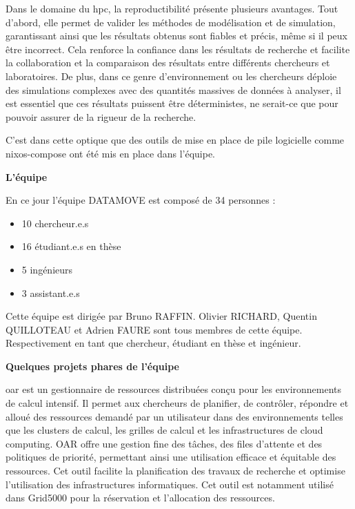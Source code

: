 \documentclass[a4paper,french,12pt, titlepage]{article}
\begin{document}
Dans le domaine du \Gls{hpc}, la reproductibilité présente plusieurs
avantages. Tout d'abord, elle permet de valider les méthodes de
modélisation et de simulation, garantissant ainsi que les résultats
obtenus sont fiables et précis, même si il peux être incorrect. Cela
renforce la confiance dans les résultats de recherche et facilite la
collaboration et la comparaison des résultats entre différents
chercheurs et laboratoires. De plus, dans ce genre d'environnement ou
les chercheurs déploie des simulations complexes avec des quantités
massives de données à analyser, il est essentiel que ces résultats
puissent être déterministes, ne serait-ce que pour pouvoir assurer de la
rigueur de la recherche.\newline

C'est dans cette optique que des outils de mise en place de pile
logicielle comme \Gls{nixos-compose} ont été mis en place dans
l'équipe.\newline

\textbf{L'équipe}\newline

En ce jour l'équipe DATAMOVE est composé de 34 personnes :

\begin{itemize}
\item
  10 chercheur.e.s
\item
  16 étudiant.e.s en thèse
\item
  5 ingénieurs
\item
  3 assistant.e.s\newline
\end{itemize}

Cette équipe est dirigée par Bruno RAFFIN. Olivier RICHARD, Quentin
QUILLOTEAU et Adrien FAURE sont tous membres de cette équipe.
Respectivement en tant que chercheur, étudiant en thèse et
ingénieur.\newline

\textbf{Quelques projets phares de l'équipe}\newline

\Gls{oar} est un gestionnaire de ressources distribuées conçu pour les
environnements de calcul intensif. Il permet aux chercheurs de
planifier, de contrôler, répondre et alloué des ressources demandé par
un utilisateur dans des environnements telles que les clusters de
calcul, les grilles de calcul et les infrastructures de cloud computing.
OAR offre une gestion fine des tâches, des files d'attente et des
politiques de priorité, permettant ainsi une utilisation efficace et
équitable des ressources. Cet outil facilite la planification des
travaux de recherche et optimise l'utilisation des infrastructures
informatiques. Cet outil est notamment utilisé dans Grid5000 pour la
réservation et l'allocation des ressources.\newline
\end{document}
